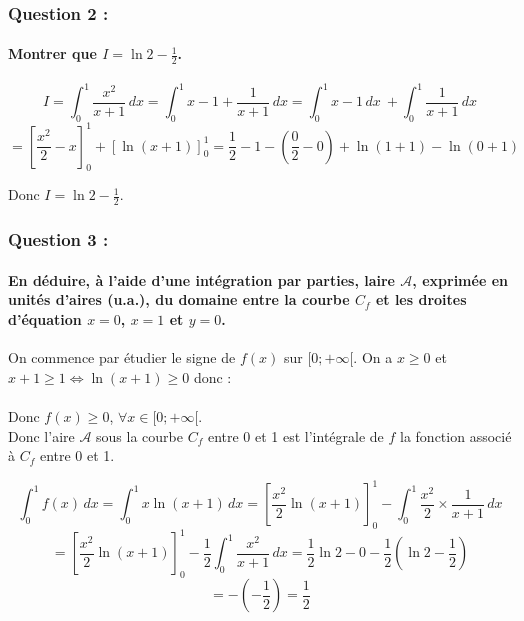 \documentclass[a4paper, 12pt]{article}
\begin{document}
\subsubsection*{Question 2 :}
\paragraph*{Montrer que $I = \ln{2} - \frac{1}{2}$.\\[5mm]}
\begin{fleqn}
\[I = \int_0^1 \frac{x^2}{x+1}\,dx  = \int_0^1 x-1 + \frac{1}{x+1} \,dx = \int_0^1 x-1 \,dx\ + \int_0^1 \frac{1}{x+1} \,dx\]
\[ = \left[ \frac{x^2}{2}-x\right]_0^1 + \left[\ln{\left(x+1\right)}\right]_0^1 = \frac{1}{2}-1 - \left(\frac{0}{2}-0 \right) + \ln{\left( 1+1 \right)} - \ln{\left(0+1\right)}\]
\end{fleqn}
Donc $I = \ln{2} - \frac{1}{2}$.

{}
\subsubsection*{Question 3 :}
\paragraph*{En déduire, à l'aide d'une intégration par parties, laire $\mathcal{A}$, exprimée en unités d'aires (u.a.), 
du domaine entre la courbe $C_f$ et les droites d'équation $x = 0$, $x=1$ et $y=0$.\\[5mm]}

On commence par étudier le signe de $f(x)$ sur $[0;+\infty[$. On a $x \geq 0$ et $x+1 \geq 1 \iff \ln{\left( x+1 \right)}\geq 0$ donc :
\\
\\
Donc $f(x) \geq 0$, $\forall x \in [0;+\infty[$. 
\\
Donc l'aire $\mathcal{A}$ sous la courbe $C_f$ entre 0 et 1 est l'intégrale de $f$ la fonction associé à $C_f$ entre 0 et 1.
\\
\begin{fleqn}
\[\int_0^1 f(x) \,dx = \int_0^1 x\ln{\left( x+1 \right)} \,dx = \left[ \frac{x^2}{2} \ln{\left( x+1 \right)} \right]_0^1 - \int_0^1 \frac{x^2}{2} \times \frac{1}{x+1} \,dx\]
\[ = \left[ \frac{x^2}{2} \ln{\left( x+1 \right)} \right]_0^1 - \frac{1}{2} \int_0^1 \frac{x^2}{x+1}\,dx = 
\frac{1}{2}\ln{2} - 0 - \frac{1}{2}\left( \ln{2} - \frac{1}{2} \right)\]
\[ = - \left( -\frac{1}{2} \right) = \frac{1}{2}\]
\end{fleqn}
\end{document}
